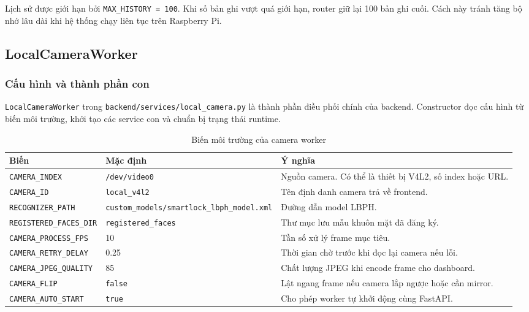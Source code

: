 Lịch sử được giới hạn bởi \texttt{MAX\_HISTORY = 100}. Khi số bản ghi vượt quá giới hạn, router giữ lại 100 bản ghi cuối. Cách này tránh tăng bộ nhớ lâu dài khi hệ thống chạy liên tục trên Raspberry Pi.

\subsection{LocalCameraWorker}

\subsubsection{Cấu hình và thành phần con}

\texttt{LocalCameraWorker} trong \texttt{backend/services/local\_camera.py} là thành phần điều phối chính của backend. Constructor đọc cấu hình từ biến môi trường, khởi tạo các service con và chuẩn bị trạng thái runtime.

\begin{table}[H]
\centering
\caption{Biến môi trường của camera worker}
\label{tab:camera_worker_env}
\begin{tabularx}{\textwidth}{|l|l|X|}
\hline
\textbf{Biến} & \textbf{Mặc định} & \textbf{Ý nghĩa} \\
\hline
\texttt{CAMERA\_INDEX} & \texttt{/dev/video0} & Nguồn camera. Có thể là thiết bị V4L2, số index hoặc URL. \\
\hline
\texttt{CAMERA\_ID} & \texttt{local\_v4l2} & Tên định danh camera trả về frontend. \\
\hline
\texttt{RECOGNIZER\_PATH} & \texttt{custom\_models/smartlock\_lbph\_model.xml} & Đường dẫn model LBPH. \\
\hline
\texttt{REGISTERED\_FACES\_DIR} & \texttt{registered\_faces} & Thư mục lưu mẫu khuôn mặt đã đăng ký. \\
\hline
\texttt{CAMERA\_PROCESS\_FPS} & 10 & Tần số xử lý frame mục tiêu. \\
\hline
\texttt{CAMERA\_RETRY\_DELAY} & 0.25 & Thời gian chờ trước khi đọc lại camera nếu lỗi. \\
\hline
\texttt{CAMERA\_JPEG\_QUALITY} & 85 & Chất lượng JPEG khi encode frame cho dashboard. \\
\hline
\texttt{CAMERA\_FLIP} & \texttt{false} & Lật ngang frame nếu camera lắp ngược hoặc cần mirror. \\
\hline
\texttt{CAMERA\_AUTO\_START} & \texttt{true} & Cho phép worker tự khởi động cùng FastAPI. \\
\hline
\end{tabularx}
\end{table}

